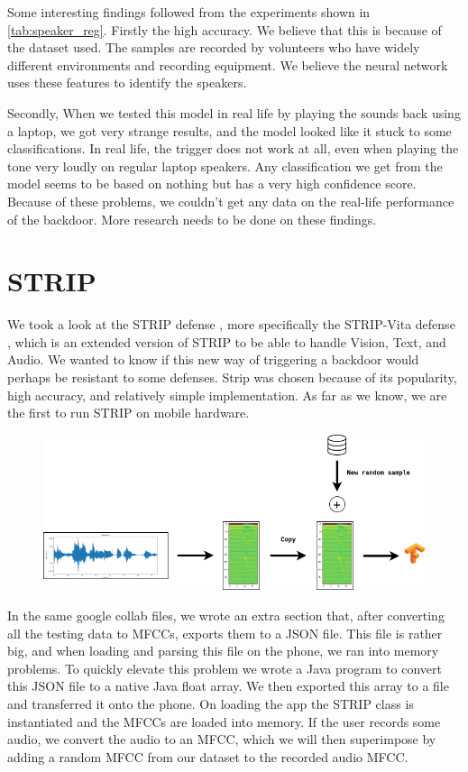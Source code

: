 \documentclass{report}
\theoremstyle{definition}
\theoremstyle{remark}
\begin{document}
Some interesting findings followed from the experiments shown in \autoref{tab:speaker_reg}. Firstly the high accuracy. We believe that this is because of the dataset used. The samples are recorded by volunteers who have widely different environments and recording equipment. We believe the neural network uses these features to identify the speakers.

Secondly, When we tested this model in real life by playing the sounds back using a laptop, we got very strange results, and the model looked like it stuck to some classifications. In real life, the trigger does not work at all, even when playing the tone very loudly on regular laptop speakers. Any classification we get from the model seems to be based on nothing but has a very high confidence score. Because of these problems, we couldn't get any data on the real-life performance of the backdoor. More research needs to be done on these findings. 

\section{STRIP \label{STRIP}}
We took a look at the STRIP defense \cite{Strip}, more specifically the STRIP-Vita defense \cite{StripVita}, which is an extended version of STRIP to be able to handle Vision, Text, and Audio. We wanted to know if this new way of triggering a backdoor would perhaps be resistant to some defenses. Strip was chosen because of its popularity, high accuracy, and relatively simple implementation. As far as we know, we are the first to run STRIP on mobile hardware.

\begin{center}
    \begin{figure}[!hbt]
        \includegraphics[width=\textwidth]{img/Strip.drawio.png}
    \end{figure}
    \label{fig:strip_schema}
\end{center}

In the same google collab files, we wrote an extra section that, after converting all the testing data to MFCCs, exports them to a JSON file. This file is rather big, and when loading and parsing this file on the phone, we ran into memory problems. To quickly elevate this problem we wrote a Java program to convert this JSON file to a native Java float array. We then exported this array to a file and transferred it onto the phone. On loading the app the STRIP class is instantiated and the MFCCs are loaded into memory. If the user records some audio, we convert the audio to an MFCC, which we will then superimpose by adding a random MFCC from our dataset to the recorded audio MFCC. 
\end{document}
